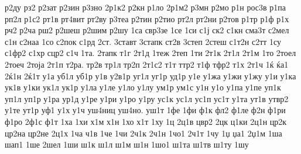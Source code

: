 {р2ду
рз2
р2зат
р2зин
р3зно
2р1к2
р2кн
р1ло
2р1м2
р3мн
р2мо
р1н
рос3в
р1па
рп2л
р1с2
рт1в
рт4вит
рт2ву
р3теа
р2тин
р2тио
рт2л
рт2ни
р2тов
р1тр
р1ф
р1х
рч2
р2ча
рш2
р2шеш
р2шим
р2шу
1са
свр3зе
1се
1си
с1ј
ск2
с1кн
сма3т
с2мел
с1н
с2наа
1со
с2пок
с1рд
2ст.
3ставт
3стапк
ст2в
3степ
2стеш
с1т2н
с2тт
1су
с1фр2
с1хр
сцр2
с1ч
1та.
2тапк
т1г
2т1д
1теж
2теп
1ти
2т1к
2т1л
2т1м
1то
2тоел
2тоеч
2тоја
2т1п
т2ра.
тр2в
тр1л
тр2п
2т1с2
т1т
ттр2
т1ф
тфр2
т1х
2т1ч
1ќ
ќа1
2ќ1н
2ќ1т
у1а
уб1л
уб1р
у1в
у2в1р
уг1л
уг1р
уд1р
у1е
у1жа
у1жи
у1жу
у1и
у1ка
ук1в
у1ки
ук1л
ук1р
у1ла
у1ле
у1ло
у1лу
ум1р
ум1с
у1н
у1о
у1па
у1пе
уп1к
уп1л
уп1р
у1ра
ур1д
у1ре
у1ри
у1ро
у1ру
ус1к
ус1л
ус1п
ус1т
у1та
ут1в
утвр2
у1те
ут1р
уф1
у1х
у1ч
уш4ниц
уш4но.
уш1т
1фе
1фи
ф1к
фл2
ф1ле
ф2н
ф1ри
ф1ро
2ф1с
ф1т
1ха
1хи
х1м
х1н
1хо
х1т
1ху
1ц
2ц1в
цвр2
2цк
ц1ки
2ц1н
цр2к
цр2на
цр2не
2ц1х
1ча
ч1в
1че
1чи
2ч1к
2ч1н
1чо1
2ч1т
1чу
1џ
џа1
2џ1м
1ша
шап1
1ше
2шел
1ши
ш1к
ш1л
ш1м
ш1н
1шо1
ш1та
ш1тв
ш1ту
1шу
}
